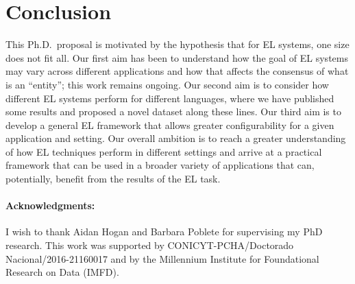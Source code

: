 \documentclass[sigconf]{acmart}
\begin{document}
\section{Conclusion}

This Ph.D.\ proposal is motivated by the hypothesis that for EL systems, one size does not fit all. Our first aim has been to understand how the goal of EL systems may vary across different applications and how that affects the consensus of what is an ``entity''; this work remains ongoing. Our second aim is to consider how different EL systems perform for different languages, where we have published some results and proposed a novel dataset along these lines. Our third aim is to develop a general EL framework that allows greater configurability for a given application and setting. Our overall ambition is to reach a greater understanding of how EL techniques perform in different settings and arrive at a practical framework that can be used in a broader variety of applications that can, potentially, benefit from the results of the EL task.

\paragraph{Acknowledgments:} I wish to thank Aidan Hogan and Barbara Poblete for supervising my PhD research. This work was supported by CONICYT-PCHA/Doctorado Nacional/2016-21160017 and by the Millennium Institute for Foundational Research on Data (IMFD).

%


\end{document}
